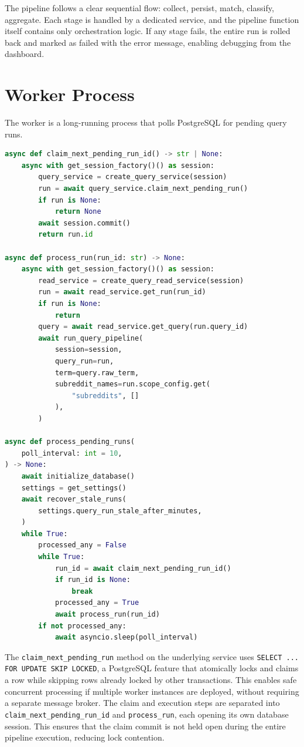 The pipeline follows a clear sequential flow: collect, persist, match, classify, aggregate. Each stage is handled by a dedicated service, and the pipeline function itself contains only orchestration logic. If any stage fails, the entire run is rolled back and marked as failed with the error message, enabling debugging from the dashboard.

\section{Worker Process}
\label{sec:worker_impl}

The worker is a long-running process that polls PostgreSQL for pending query runs.

\begin{lstlisting}[language=Python, caption={Worker helper functions and main polling loop}]
async def claim_next_pending_run_id() -> str | None:
    async with get_session_factory()() as session:
        query_service = create_query_service(session)
        run = await query_service.claim_next_pending_run()
        if run is None:
            return None
        await session.commit()
        return run.id

async def process_run(run_id: str) -> None:
    async with get_session_factory()() as session:
        read_service = create_query_read_service(session)
        run = await read_service.get_run(run_id)
        if run is None:
            return
        query = await read_service.get_query(run.query_id)
        await run_query_pipeline(
            session=session,
            query_run=run,
            term=query.raw_term,
            subreddit_names=run.scope_config.get(
                "subreddits", []
            ),
        )

async def process_pending_runs(
    poll_interval: int = 10,
) -> None:
    await initialize_database()
    settings = get_settings()
    await recover_stale_runs(
        settings.query_run_stale_after_minutes,
    )
    while True:
        processed_any = False
        while True:
            run_id = await claim_next_pending_run_id()
            if run_id is None:
                break
            processed_any = True
            await process_run(run_id)
        if not processed_any:
            await asyncio.sleep(poll_interval)
\end{lstlisting}

\begin{sloppypar}
The \texttt{claim\_next\_pending\_run} method on the underlying service uses \texttt{SELECT ... FOR UPDATE SKIP LOCKED}, a PostgreSQL feature that atomically locks and claims a row while skipping rows already locked by other transactions. This enables safe concurrent processing if multiple worker instances are deployed, without requiring a separate message broker. The claim and execution steps are separated into \texttt{claim\_next\_pending\_run\_id} and \texttt{process\_run}, each opening its own database session. This ensures that the claim commit is not held open during the entire pipeline execution, reducing lock contention.
\end{sloppypar}

